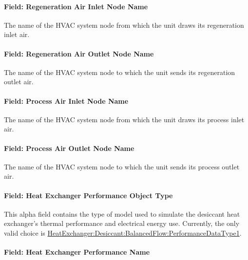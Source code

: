 \paragraph{Field: Regeneration Air Inlet Node Name}\label{field-regeneration-air-inlet-node-name-000}

The name of the HVAC system node from which the unit draws its regeneration inlet air.

\paragraph{Field: Regeneration Air Outlet Node Name}\label{field-regeneration-air-outlet-node-name}

The name of the HVAC system node to which the unit sends its regeneration outlet air.

\paragraph{Field: Process Air Inlet Node Name}\label{field-process-air-inlet-node-name-000}

The name of the HVAC system node from which the unit draws its process inlet air.

\paragraph{Field: Process Air Outlet Node Name}\label{field-process-air-outlet-node-name-000}

The name of the HVAC system node to which the unit sends its process outlet air.

\paragraph{Field: Heat Exchanger Performance Object Type}\label{field-heat-exchanger-performance-object-type}

This alpha field contains the type of model used to simulate the desiccant heat exchanger's thermal performance and electrical energy use. Currently, the only valid choice is \hyperref[heatexchangerdesiccantbalancedflowperformancedatatype1]{HeatExchanger:Desiccant:BalancedFlow:PerformanceDataType1}.

\paragraph{Field: Heat Exchanger Performance Name}\label{field-heat-exchanger-performance-name}

